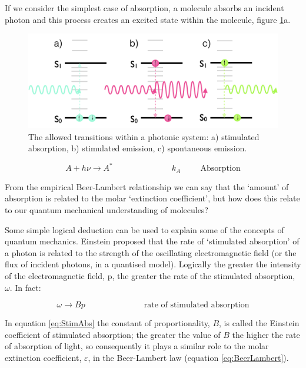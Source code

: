 \documentclass[
]{book}
\begin{document}
If we consider the simplest case of absorption, a molecule absorbs an incident photon and this process creates an excited state within the molecule, figure \ref{fig:AbsStimEm}a.

\begin{figure}

{\centering \includegraphics[width=0.7\linewidth]{images/AbsStimEm} 

}

\caption{The allowed transitions within a photonic system: a) stimulated absorption, b) stimulated emission, c) spontaneous emission.}\label{fig:AbsStimEm}
\end{figure}

\begin{equation}
A+ h \nu \longrightarrow A^\ast \hspace{3cm} k_A \hspace{1cm} \textrm{Absorption}
\label{eq:Abs}
\end{equation}

From the empirical Beer-Lambert relationship we can say that the `amount' of absorption is related to the molar `extinction coefficient', but how does this relate to our quantum mechanical understanding of molecules?

Some simple logical deduction can be used to explain some of the concepts of quantum mechanics.
Einstein proposed that the rate of `stimulated absorption' of a photon is related to the strength of the oscillating electromagnetic field (or the flux of incident photons, in a quantised model). Logically the greater the intensity of the electromagnetic field, p, the greater the rate of the stimulated absorption, \(\omega\). In fact:

\begin{equation}
\omega \longrightarrow B p \hspace{3cm} \textrm{rate of stimulated absorption}
\label{eq:StimAbs}
\end{equation}

In equation \eqref{eq:StimAbs} the constant of proportionality, \(B\), is called the Einstein coefficient of stimulated absorption; the greater the value of \(B\) the higher the rate of absorption of light, so consequently it plays a similar role to the molar extinction coefficient, \(\varepsilon\), in the Beer-Lambert law (equation \eqref{eq:BeerLambert}).
\end{document}
